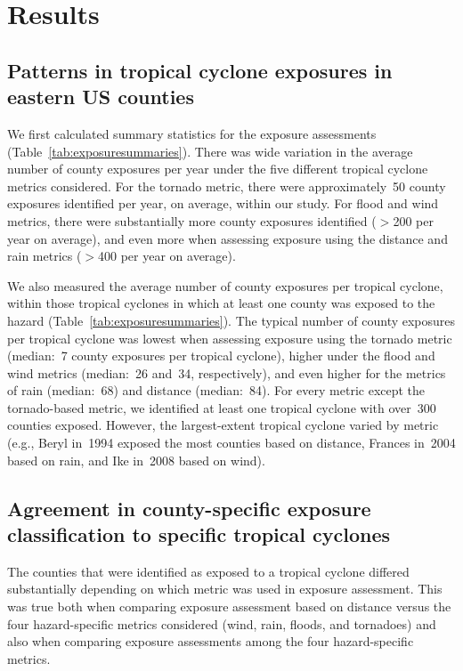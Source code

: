 \section*{Results}

\subsection*{Patterns in tropical cyclone exposures in eastern \ac{US} counties}

We first calculated summary statistics for the exposure assessments
(Table~\ref{tab:exposuresummaries}). There was wide variation in the average
number of county exposures per year under the five different tropical cyclone
metrics considered. For the tornado metric, there were approximately~50 county
exposures identified per year, on average, within our study.  For flood and
wind metrics, there were substantially more county exposures identified ($>$200
per year on average), and even more when assessing exposure using the distance
and rain metrics ($>$400 per year on average). 

We also measured the average number of county exposures per tropical cyclone,
within those tropical cyclones in which at least one county was exposed to the
hazard (Table~\ref{tab:exposuresummaries}). The typical number of county
exposures per tropical cyclone was lowest when assessing exposure using the
tornado metric (median:~7 county exposures per tropical cyclone), higher under
the flood and wind metrics (median:~26 and~34, respectively), and even higher
for the metrics of rain (median:~68) and distance (median:~84).  For every
metric except the tornado-based metric, we identified at least one tropical
cyclone with over~300 counties exposed.  However, the largest-extent tropical
cyclone varied by metric (e.g., Beryl in~1994 exposed the most counties based
on distance, Frances in~2004 based on rain, and Ike in~2008 based on wind).

\subsection*{Agreement in county-specific exposure classification to specific
tropical cyclones}

The counties that were identified as exposed to a tropical cyclone differed
substantially depending on which metric was used in exposure assessment.  This
was true both when comparing exposure assessment based on distance versus the
four hazard-specific metrics considered (wind, rain, floods, and tornadoes)
and also when comparing exposure assessments among the four hazard-specific
metrics. 

